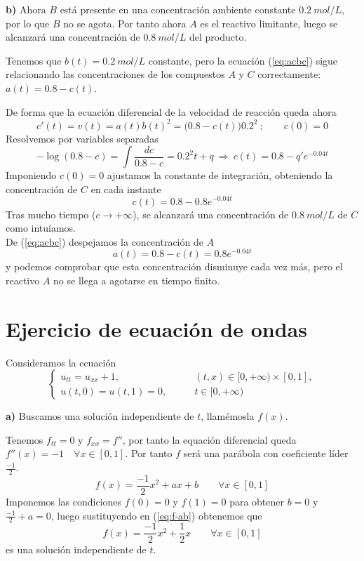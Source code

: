 \documentclass[a4]{article}
\begin{document}
\textbf{b)} Ahora $B$ está presente en una concentración ambiente
constante $0.2\ mol/L$, por lo que $B$ no se agota. Por tanto ahora
$A$ es el reactivo limitante, luego se alcanzará una concentración de
$0.8\ mol/L$ del producto.

Tenemos que $b(t)=0.2\ mol/L$ constante, pero la ecuación
(\ref{eq:acbc}) sigue relacionando las concentraciones de los
compuestos $A$ y $C$ correctamente: $a(t)=0.8-c(t)$.

De forma que la ecuación diferencial de la velocidad de reacción queda
ahora
\begin{equation}
  \label{eq:c-b}
  c'(t)=v(t)=a(t)b(t)^2=\big(0.8-c(t)\big)0.2^2\ ;\qquad c(0)=0
\end{equation}
Resolvemos por variables separadas
\[-\log(0.8-c)=\int\frac{dc}{0.8-c}=0.2^2t+q\ \Longrightarrow\
  c(t)=0.8-q'e^{-0.04t}\] Imponiendo $c(0)=0$ ajustamos la constante
de integración, obteniendo la concentración de $C$ en cada instante
\[c(t)=0.8-0.8e^{-0.04t}\] Tras mucho tiempo ($c\to +\infty$), se
alcanzará una concentración de $0.8\ mol/L$ de $C$ como intuíamos. \\
De (\ref{eq:acbc}) despejamos la concentración de $A$
\[a(t)=0.8-c(t)=0.8e^{-0.04t}\] y podemos comprobar que esta
concentración disminuye cada vez más, pero el reactivo $A$ no se llega
a agotarse en tiempo finito.
 
\section{Ejercicio de ecuación de ondas}

Consideramos la ecuación
\begin{equation} \label{eq:ecuacion}
  \begin{cases}
    u_{tt}=u_{xx}+1,\qquad&(t,x)\in [0,+\infty)\times [0,1], \\
    u(t,0)=u(t,1)=0,\qquad &t\in [0,+\infty)
  \end{cases}
\end{equation}

\textbf{a)} Buscamos una solución independiente de $t$, llamémosla
$f(x)$.

Tenemos $f_{tt}=0$ y $f_{xx}=f''$, por tanto la equación diferencial
queda $f''(x)=-1\quad\forall x\in[0,1]$. Por tanto $f$ será una
parábola con coeficiente líder $\frac{-1}{2}$.
\begin{equation} \label{eq:f-ab}
  f(x)=\frac{-1}{2}x^2+ax+b\qquad\forall x\in [0,1]
\end{equation}
Imponemos las condiciones $f(0)=0$ y $f(1)=0$ para obtener $b=0$ y
$\frac{-1}{2}+a=0$, luego sustituyendo en (\ref{eq:f-ab}) obtenemos que
\begin{equation} \label{eq:f}
f(x)=\frac{-1}{2}x^2+\frac{1}{2}x\qquad\forall x\in [0,1]
\end{equation}
es una solución independiente de $t$.
\end{document}
